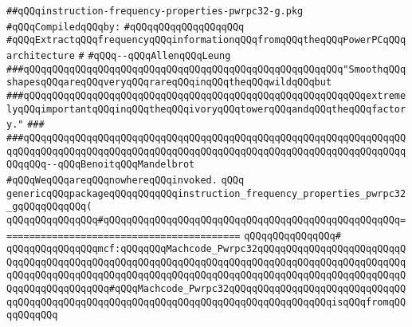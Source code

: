 \label{src/lib/compiler/back/low/pwrpc32/code/instruction-frequency-properties-pwrpc32-g.pkg}
\verb|##qQQqinstruction-frequency-properties-pwrpc32-g.pkg|\newline
\newline
\verb|#qQQqCompiledqQQqby:|\newline
\verb|#qQQqqQQqqQQqqQQqqQQq|\newline
\newline
\verb|#qQQqExtractqQQqfrequencyqQQqinformationqQQqfromqQQqtheqQQqPowerPCqQQqarchitecture|\newline
\verb|#|\newline
\verb|#qQQq--qQQqAllenqQQqLeung|\newline
\newline
\newline
\newline
\verb|###qQQqqQQqqQQqqQQqqQQqqQQqqQQqqQQqqQQqqQQqqQQqqQQqqQQqqQQq"SmoothqQQqshapesqQQqareqQQqveryqQQqrareqQQqinqQQqtheqQQqwildqQQqbut|\newline
\verb|###qQQqqQQqqQQqqQQqqQQqqQQqqQQqqQQqqQQqqQQqqQQqqQQqqQQqqQQqqQQqextremelyqQQqimportantqQQqinqQQqtheqQQqivoryqQQqtowerqQQqandqQQqtheqQQqfactory."|\newline
\verb|###|\newline
\verb|###qQQqqQQqqQQqqQQqqQQqqQQqqQQqqQQqqQQqqQQqqQQqqQQqqQQqqQQqqQQqqQQqqQQqqQQqqQQqqQQqqQQqqQQqqQQqqQQqqQQqqQQqqQQqqQQqqQQqqQQqqQQqqQQqqQQqqQQqqQQqqQQq--qQQqBenoitqQQqMandelbrot|\newline
\newline
\newline
\verb|#qQQqWeqQQqareqQQqnowhereqQQqinvoked.|\newline
\verb|qQQq|\newline
\verb|genericqQQqpackageqQQqqQQqqQQqinstruction_frequency_properties_pwrpc32_gqQQqqQQqqQQq(|\newline
\verb|qQQqqQQqqQQqqQQq#qQQqqQQqqQQqqQQqqQQqqQQqqQQqqQQqqQQqqQQqqQQqqQQqqQQq==========================================|\newline
\verb|qQQqqQQqqQQqqQQq#|\newline
\verb|qQQqqQQqqQQqqQQqmcf:qQQqqQQqMachcode_Pwrpc32qQQqqQQqqQQqqQQqqQQqqQQqqQQqqQQqqQQqqQQqqQQqqQQqqQQqqQQqqQQqqQQqqQQqqQQqqQQqqQQqqQQqqQQqqQQqqQQqqQQqqQQqqQQqqQQqqQQqqQQqqQQqqQQqqQQqqQQqqQQqqQQqqQQqqQQqqQQqqQQqqQQqqQQqqQQqqQQqqQQqqQQq#qQQqMachcode_Pwrpc32qQQqqQQqqQQqqQQqqQQqqQQqqQQqqQQqqQQqqQQqqQQqqQQqqQQqqQQqqQQqqQQqqQQqqQQqqQQqqQQqqQQqqQQqisqQQqfromqQQqqQQqqQQq|\newline
